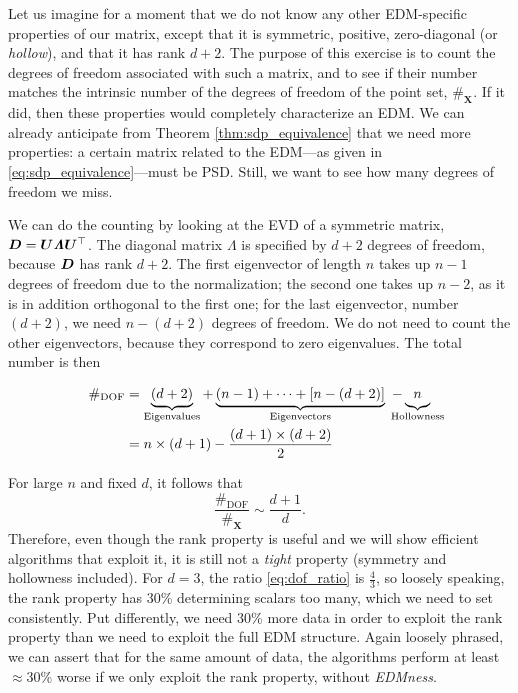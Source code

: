 \documentclass[10pt,double]{IEEEtran}
\providecommand{\mat}[1]{\ensuremath{\boldsymbol{#1}}}
\providecommand{\mX}{\mat{X}}\providecommand{\mY}{\mat{Y}}
\newcommand{\T}{\ensuremath{\top}}
\newcommand{\mLambda}{\bm{\mathit{\Lambda}}}
\newcommand{\rev}[1]{{#1}}
\begin{document}
\rev{Let us imagine for a moment that we do not know any other EDM-specific
properties of our matrix, except that it is symmetric, positive, zero-diagonal
(or \emph{hollow}), and that it has rank $d+2$. The purpose of this exercise
is to count the degrees of freedom associated with such a matrix, and to see
if their number matches the intrinsic number of the degrees of freedom of the
point set, $\#_{\mX}$. If it did, then these properties would completely
characterize an EDM. We can already anticipate from Theorem
\ref{thm:sdp_equivalence} that we need more properties: a certain matrix related to the
EDM---as given in \eqref{eq:sdp_equivalence}---must be PSD. Still, we want to
see how many degrees of freedom we miss.

We can do the counting by looking at the EVD of a symmetric matrix, $\mD =
\mU \mLambda \mU^\T$. The diagonal matrix $\mLambda$ is specified by $d+2$ degrees
of freedom, because $\mD$ has rank $d+2$. The first eigenvector of length $n$
takes up $n-1$ degrees of freedom due to the normalization; the second one
takes up $n-2$, as it is in addition orthogonal to the first one; for the last
eigenvector, number $(d+2)$, we need $n - (d+2)$ degrees of freedom. We do not
need to count the other eigenvectors, because they correspond to zero
eigenvalues. The total number is then

\begin{align*}
  \#_\text{DOF} &= \underbrace{(d+2)}_{\text{Eigenvalues}} + \underbrace{(n-1) + \cdots + [n-(d+2)]}_{\text{Eigenvectors}} \ - \underbrace{\phantom{(}n\phantom{)}}_{\mathclap{\text{Hollowness}}} \nonumber \\
	 &= n \times (d+1) - \frac{(d+1) \times (d+2)}{2} \nonumber \\
\end{align*}
}

For large $n$ and fixed $d$, it follows that
\begin{equation}
	\label{eq:dof_ratio}
	\frac{\#_\text{DOF}}{\#_{\mX}} \sim \frac{d+1}{d}.
\end{equation}
Therefore, even though the rank property is useful and we will show efficient
algorithms that exploit it, it is still not a \emph{tight} property (symmetry
and hollowness included). For $d=3$, the ratio
\eqref{eq:dof_ratio} is $\frac{4}{3}$, so loosely speaking, the rank property
has 30\% determining scalars too many, which we need to set consistently.
Put differently, we need 30\% more data in order to exploit the rank property
than we need to exploit the full EDM structure. Again loosely phrased, we can
assert that for the same amount of data, the algorithms perform at least
$\approx$30\% worse if we only exploit the rank property, without
\emph{EDMness}.
\end{document}
